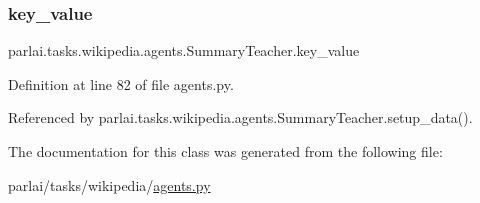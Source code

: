 \subsubsection{\texorpdfstring{key\+\_\+value}{key\_value}}
{\footnotesize\ttfamily parlai.\+tasks.\+wikipedia.\+agents.\+Summary\+Teacher.\+key\+\_\+value}



Definition at line 82 of file agents.\+py.



Referenced by parlai.\+tasks.\+wikipedia.\+agents.\+Summary\+Teacher.\+setup\+\_\+data().



The documentation for this class was generated from the following file\+:\begin{DoxyCompactItemize}
\item 
parlai/tasks/wikipedia/\hyperlink{parlai_2tasks_2wikipedia_2agents_8py}{agents.\+py}\end{DoxyCompactItemize}
